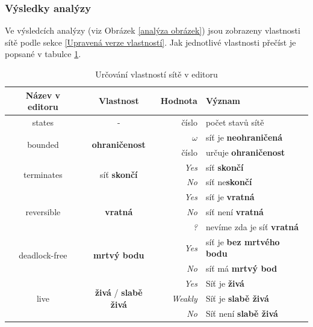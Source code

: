 \documentclass[
  biblatex,
  glossaries,
  printversion
]{kidiplom}
\begin{document}
\subsubsection{Výsledky analýzy}\label{výsledky analýzy}

Ve výsledcích analýzy (viz Obrázek \ref{analýza obrázek}) jsou zobrazeny vlastnosti sítě podle sekce \ref{Upravená verze vlastností}.
Jak jednotlivé vlastnosti přečíst je popsané v tabulce \ref{vlastnosti site v editoru}.

\begin{table}[h]
  \centering
  \begin{tabular}{| c | c | r l |}
  \hline
    Název v editoru & Vlastnost & Hodnota & Význam \\
    \hline
    \hline
     states & - & číslo & počet stavů sítě \\ 
    \hline
    \multirow{2}{*}{bounded} & \multirow{2}{*}{\textbf{ohraničenost}} & \textit{$\omega$} &  síť je \textbf{neohraničená} \\ 
    &                   & číslo & určuje \textbf{ohraničenost} \\ 
    \hline
\multirow{2}{*}{terminates} & \multirow{2}{*}{síť \textbf{skončí}} & \textit{Yes} & síť \textbf{skončí} \\ 
    &                   & \textit{No} & síť ne\textbf{skončí} \\ 
    \hline
\multirow{3}{*}{reversible} & \multirow{3}{*}{\textbf{vratná}} & \textit{Yes} & síť je \textbf{vratná} \\ 
    &                   &   \textit{No} & síť není \textbf{vratná}  \\
    &                   & \textit{?} & nevíme zda je síť \textbf{vratná} \\ 
    \hline
\multirow{2}{*}{deadlock-free} & \multirow{2}{*}{\textbf{mrtvý bodu}} & \textit{Yes} & síť je \textbf{bez mrtvého bodu} \\ 
    &                   &  \textit{No} & síť má \textbf{mrtvý bod}  \\ 
    \hline
\multirow{3}{*}{live} & \multirow{3}{*}{\textbf{živá} / \textbf{slabě živá}} 
                         & \textit{Yes} & Síť je \textbf{živá} \\ 
    &                   & \textit{Weakly}  & Síť je \textbf{slabě živá} \\ 
    &                   & \textit{No} & Síť není \textbf{slabě živá} \\ 
    \hline

  \end{tabular}
  \caption{Určování vlastností sítě v editoru}\label{vlastnosti site v editoru}  
\end{table}
\end{document}
